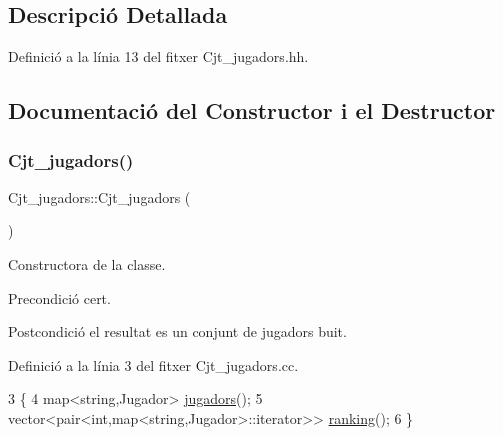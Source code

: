 \subsection{Descripció Detallada}


Definició a la línia 13 del fitxer Cjt\+\_\+jugadors.\+hh.



\subsection{Documentació del Constructor i el Destructor}
\mbox{\label{class_cjt__jugadors_a473281833edd8838e3517fff07a6b9f1}} 
\subsubsection{\texorpdfstring{Cjt\+\_\+jugadors()}{Cjt\_jugadors()}}
{\footnotesize\ttfamily Cjt\+\_\+jugadors\+::\+Cjt\+\_\+jugadors (\begin{DoxyParamCaption}{ }\end{DoxyParamCaption})}



Constructora de la classe. 

\begin{DoxyPrecond}{Precondició}
cert. 
\end{DoxyPrecond}
\begin{DoxyPostcond}{Postcondició}
el resultat es un conjunt de jugadors buit. 
\end{DoxyPostcond}


Definició a la línia 3 del fitxer Cjt\+\_\+jugadors.\+cc.


\begin{DoxyCode}
3                            \{
4     map<string,Jugador> \mbox{\hyperlink{class_cjt__jugadors_a9a7fd899cca7f3c126120c8e7b4719d4}{jugadors}}();
5     vector<pair<int,map<string,Jugador>::iterator>> \mbox{\hyperlink{class_cjt__jugadors_af9f7e71820fb657bf489ce72a31e8034}{ranking}}();
6 \}
\end{DoxyCode}
\mbox{\label{class_cjt__jugadors_a49d29aca09d1060d8c3db9771125b85f}} 
